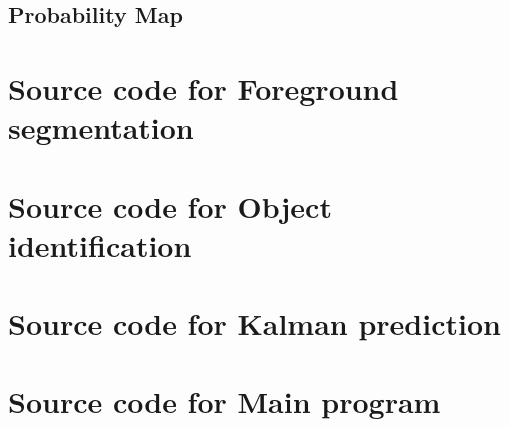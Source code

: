 \documentclass[10pt, a4paper, twoside]{article}
\numberwithin{equation}{subsection}
\numberwithin{figure}{section}
\begin{document}
\subsection{Probability Map}
\label{sec:ProbMap_code}

\newpage


\newpage
\section{Source code for Foreground segmentation}
\label{sec:ForeGroundSeg_code}

\newpage


\newpage
\section{Source code for Object identification}
\label{sec:ObjID_code}

\newpage


\newpage
\section{Source code for Kalman prediction}
\label{sec:Kalman_code}

\newpage


\newpage
\section{Source code for Main program}
\label{sec:Main_code}



%
\end{document}

